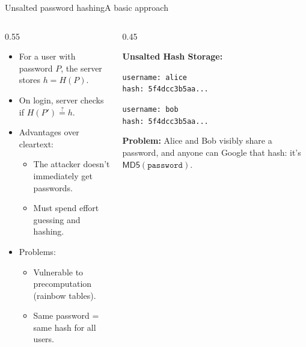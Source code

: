 \ifdefined\PRESENTATION\else\PassOptionsToClass{handout}{beamer}\fi\documentclass[aspectratio=169, lualatex]{beamer}
\begin{document}
\begin{frame}{Unsalted password hashing}{A basic approach}
	\begin{columns}[c]
		\begin{column}{0.55\textwidth}
			\begin{itemize}
				\item For a user with password $P$, the server stores $h = H(P)$.
				\item On login, server checks if $H(P') \stackrel{?}{=} h$.
				\item Advantages over cleartext:
				      \begin{itemize}
					      \item The attacker doesn't immediately get passwords.
					      \item Must spend effort guessing and hashing.
				      \end{itemize}
				\item Problems:
				      \begin{itemize}
					      \item Vulnerable to precomputation (rainbow tables).
					      \item Same password = same hash for all users.
				      \end{itemize}
			\end{itemize}
		\end{column}
		\begin{column}{0.45\textwidth}
			\begin{tcolorbox}[colback=black!5!white,colframe=ciphergray]
				\textbf{Unsalted Hash Storage:}

				\vspace{0.2cm}

				\texttt{username: alice}\\
				\texttt{hash: 5f4dcc3b5aa...}

				\vspace{0.2cm}

				\texttt{username: bob}\\
				\texttt{hash: 5f4dcc3b5aa...}

				\vspace{0.3cm}

				\textcolor{cipherprimary}{\textbf{Problem:} \small Alice and Bob visibly share a password, and anyone can Google that hash: it's $\mathsf{MD5}(\texttt{password})$.}
			\end{tcolorbox}
		\end{column}
	\end{columns}
\end{frame}
\end{document}
